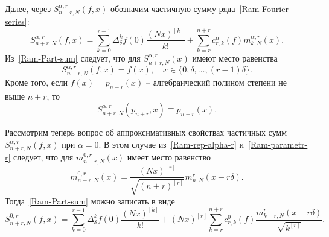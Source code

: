 Далее, через $S_{n+r,N}^{\alpha,r}(f,x)$ обозначим частичную сумму ряда~\eqref{Ram-Fourier-series}:
\begin{equation}\label{Ram-Part-sum}
S_{n+r,N}^{\alpha,r}(f,x)=\sum_{k=0}^{r-1}\Delta_\delta^kf(0)\frac{(Nx)^{[k]}}{k!}+\sum_{k=r}^{n+r} c^\alpha_{r,k}(f)m^{\alpha,r}_{k,N}(x).
\end{equation}
Из~\eqref{Ram-Part-sum} следует, что для $S_{n+r,N}^{\alpha,r}(x)$ имеют место равенства
\begin{equation*}
S_{n+r,N}^{\alpha,r}(f,x)=f(x), \quad x\in\{0, \delta, \ldots, (r-1)\delta\}.
\end{equation*}
Кроме того, если $f(x)=p_{n+r}(x)$ -- алгебраический полином степени не выше $n+r$, то
\begin{equation*}
S_{n+r,N}^{\alpha,r}(p_{n+r},x)\equiv p_{n+r}(x).
\end{equation*}

Рассмотрим теперь вопрос об аппроксимативных свойствах частичных сумм \\$S_{n+r,N}^{\alpha,r}(f,x)$ при $\alpha=0$. В этом случае из~\eqref{Ram-rep-alpha-r} и~\eqref{Ram-parametr-r} следует, что для $m_{n+r,N}^{0,r}(x)$ имеет место равенство
$$
m_{n+r,N}^{0,r}(x)=\frac{(Nx)^{[r]}}{\sqrt{(n+r)^{[r]}}}m_{n,N}^r(x-r\delta).
$$
Тогда~\eqref{Ram-Part-sum} можно записать в виде
\begin{equation*}
S_{n+r,N}^{0,r}(f,x)=\sum_{k=0}^{r-1}\Delta_\delta^kf(0){\frac{(Nx)^{[k]}}{k!}}+(Nx)^{[r]}\sum_{k=r}^{n+r} c^0_{r,k}(f)\frac{m^{r}_{k-r,N}(x-r\delta)}{\sqrt{k^{[r]}}}.
\end{equation*}


